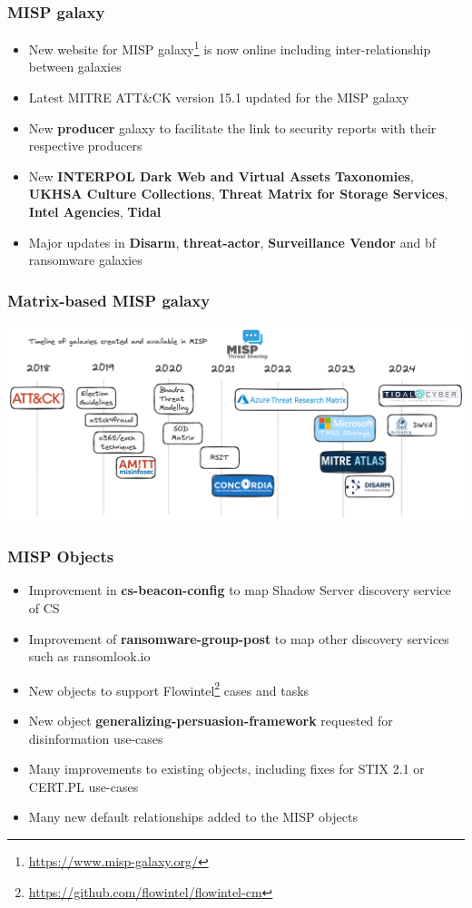 \begin{frame}
    \frametitle{MISP galaxy}
    \begin{itemize}
	\item New website for MISP galaxy\footnote{\url{https://www.misp-galaxy.org/}} is now online including inter-relationship between galaxies
	\item Latest MITRE ATT\&CK version 15.1 updated for the MISP galaxy
        \item New {\bf producer} galaxy to facilitate the link to security reports with their respective producers
	\item New {\bf INTERPOL Dark Web and Virtual Assets Taxonomies}, {\bf UKHSA Culture Collections}, {\bf Threat Matrix for Storage Services}, {\bf Intel Agencies}, {\bf Tidal}
	\item Major updates in {\bf Disarm}, {\bf threat-actor}, {\bf Surveillance Vendor} and {bf ransomware} galaxies
    \end{itemize}
\end{frame}

\begin{frame}
    \frametitle{Matrix-based MISP galaxy}
    \begin{center}
	    \includegraphics[scale=0.14]{timeline.png}
    \end{center}
\end{frame}

\begin{frame}
    \frametitle{MISP Objects}
    \begin{itemize} 
        \item Improvement in \textbf{cs-beacon-config} to map Shadow Server discovery service of CS
        \item Improvement of \textbf{ransomware-group-post} to map other discovery services such as ransomlook.io
        \item New objects to support Flowintel\footnote{\url{https://github.com/flowintel/flowintel-cm}} cases and tasks
        \item New object \textbf{generalizing-persuasion-framework} requested for disinformation use-cases
        \item Many improvements to existing objects, including fixes for STIX 2.1 or CERT.PL use-cases
        \item Many new default relationships added to the MISP objects
    \end{itemize}
\end{frame}

